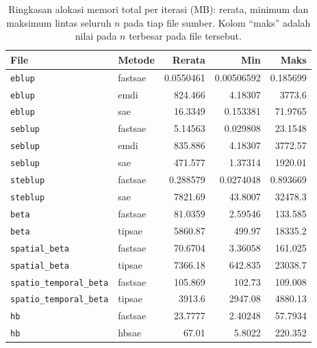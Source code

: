 \begin{table}[htbp]
\centering
\caption{Ringkasan alokasi memori total per iterasi (MB): rerata, minimum dan maksimum lintas seluruh $n$ pada tiap file sumber. Kolom ``maks'' adalah nilai pada $n$ terbesar pada file tersebut.}
\label{tab:mem-summary}
\small
\begin{tabular}{llrrr}
\toprule
File & Metode & Rerata & Min & Maks \\
\midrule
\texttt{eblup} & fastsae & 0.0550461 & 0.00506592 & 0.185699 \\
\texttt{eblup} & emdi & 824.466 & 4.18307 &  3773.6 \\
\texttt{eblup} & sae & 16.3349 & 0.153381 & 71.9765 \\
\texttt{seblup} & fastsae & 5.14563 & 0.029808 & 23.1548 \\
\texttt{seblup} & emdi & 835.886 & 4.18307 & 3772.57 \\
\texttt{seblup} & sae & 471.577 & 1.37314 & 1920.01 \\
\texttt{steblup} & fastsae & 0.288579 & 0.0274048 & 0.893669 \\
\texttt{steblup} & sae & 7821.69 & 43.8007 & 32478.3 \\
\texttt{beta} & fastsae & 81.0359 & 2.59546 & 133.585 \\
\texttt{beta} & tipsae & 5860.87 &  499.97 & 18335.2 \\
\texttt{spatial\_beta} & fastsae & 70.6704 & 3.36058 & 161.025 \\
\texttt{spatial\_beta} & tipsae & 7366.18 & 642.835 & 23038.7 \\
\texttt{spatio\_temporal\_beta} & fastsae & 105.869 &  102.73 & 109.008 \\
\texttt{spatio\_temporal\_beta} & tipsae &  3913.6 & 2947.08 & 4880.13 \\
\texttt{hb} & fastsae & 23.7777 & 2.40248 & 57.7934 \\
\texttt{hb} & hbsae &   67.01 &  5.8022 & 220.352 \\
\bottomrule
\end{tabular}
\end{table}

